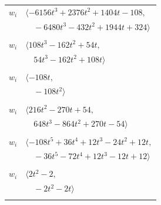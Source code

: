 \documentclass[11pt]{article}
\begin{document}
\begin{longtable}{@{}ll@{}}
$w_i$ & $\langle -6156t^{3}+2376t^{2}+1404t-108,$\\
 & $\quad -6480t^{3}-432t^{2}+1944t+324\rangle$\\
\addlinespace[2pt]
\multicolumn{2}{@{}p{0.97\textwidth}@{}}{$i=39$, $D_i=2$, $e_i=3$, $\rho_{ij}$: $13{:}1, \allowbreak 16{:}2, \allowbreak 19{:}1, \allowbreak 27{:}2, \allowbreak 29{:}1, \allowbreak 41{:}2$}\\
$w_i$ & $\langle 108t^{3}-162t^{2}+54t,$\\
 & $\quad 54t^{3}-162t^{2}+108t\rangle$\\
\addlinespace[2pt]
\multicolumn{2}{@{}p{0.97\textwidth}@{}}{$i=40$, $D_i=6$, $e_i=1$, $\rho_{ij}$: $5{:}2, \allowbreak 7{:}1, \allowbreak 15{:}2, \allowbreak 18{:}2, \allowbreak 33{:}1, \allowbreak 37{:}2$}\\
$w_i$ & $\langle -108t,$\\
 & $\quad -108t^{2}\rangle$\\
\addlinespace[2pt]
\multicolumn{2}{@{}p{0.97\textwidth}@{}}{$i=41$, $D_i=6$, $e_i=1$, $\rho_{ij}$: $1{:}2, \allowbreak 6{:}2, \allowbreak 11{:}1, \allowbreak 18{:}1, \allowbreak 25{:}2, \allowbreak 37{:}2, \allowbreak 39{:}1$}\\
$w_i$ & $\langle 216t^{2}-270t+54,$\\
 & $\quad 648t^{3}-864t^{2}+270t-54\rangle$\\
\addlinespace[2pt]
\multicolumn{2}{@{}p{0.97\textwidth}@{}}{$i=42$, $D_i=4$, $\rho_{ij}$: $5{:}2, \allowbreak 6{:}1, \allowbreak 13{:}2, \allowbreak 21{:}2, \allowbreak 22{:}2, \allowbreak 36{:}2, \allowbreak 37{:}1, \allowbreak 38{:}1$}\\
$w_i$ & $\langle -108t^{5}+36t^{4}+12t^{3}-24t^{2}+12t,$\\
 & $\quad -36t^{5}-72t^{4}+12t^{3}-12t+12\rangle$\\
\addlinespace[2pt]
\multicolumn{2}{@{}p{0.97\textwidth}@{}}{$i=43$, $D_i=2$, $\rho_{ij}$: $5{:}2, \allowbreak 20{:}1, \allowbreak 29{:}1, \allowbreak 33{:}1$}\\
$w_i$ & $\langle 2t^{2}-2,$\\
 & $\quad -2t^{2}-2t\rangle$\\
\addlinespace[2pt]
\end{longtable}
\endgroup
\end{document}
